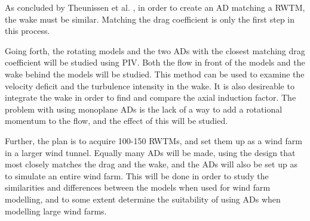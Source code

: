 As concluded by Theunissen et al. \cite{Theunissen2014}, in order to create an \gls{AD} matching a \gls{RWTM}, the wake must be similar. Matching the drag coefficient is only the first step in this process. 

Going forth, the rotating models and the two \gls{AD}s with the closest matching drag coefficient will be studied using \gls{PIV}. Both the flow in front of the models and the wake behind the models will be studied. This method can be used to examine the velocity deficit and the turbulence intensity in the wake. It is also desireable to integrate the wake in order to find and compare the axial induction factor. The problem with using monoplane \gls{AD}s is the lack of a way to add a rotational momentum to the flow, and the effect of this will be studied. 

Further, the plan is to acquire 100-150 \gls{RWTM}s, and set them up as a wind farm in a larger wind tunnel. Equally many \gls{AD}s will be made, using the design that most closely matches the drag and the wake, and the \gls{AD}s will also be set up as to simulate an entire wind farm. This will be done in order to study the similarities and differences between the models when used for wind farm modelling, and to some extent determine the suitability of using \gls{AD}s when modelling large wind farms. 




